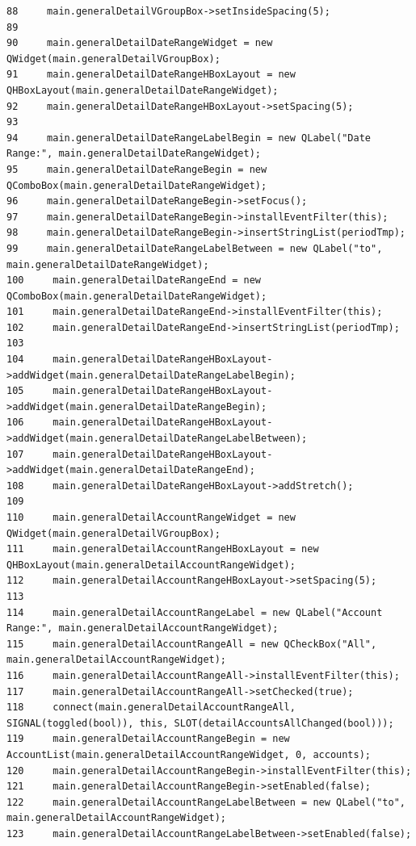 \begin{verbatim}
88     main.generalDetailVGroupBox->setInsideSpacing(5);
89     
90     main.generalDetailDateRangeWidget = new QWidget(main.generalDetailVGroupBox);
91     main.generalDetailDateRangeHBoxLayout = new QHBoxLayout(main.generalDetailDateRangeWidget);
92     main.generalDetailDateRangeHBoxLayout->setSpacing(5);
93     
94     main.generalDetailDateRangeLabelBegin = new QLabel("Date Range:", main.generalDetailDateRangeWidget);
95     main.generalDetailDateRangeBegin = new QComboBox(main.generalDetailDateRangeWidget);
96     main.generalDetailDateRangeBegin->setFocus();
97     main.generalDetailDateRangeBegin->installEventFilter(this);
98     main.generalDetailDateRangeBegin->insertStringList(periodTmp);
99     main.generalDetailDateRangeLabelBetween = new QLabel("to", main.generalDetailDateRangeWidget);
100     main.generalDetailDateRangeEnd = new QComboBox(main.generalDetailDateRangeWidget);
101     main.generalDetailDateRangeEnd->installEventFilter(this);
102     main.generalDetailDateRangeEnd->insertStringList(periodTmp);
103     
104     main.generalDetailDateRangeHBoxLayout->addWidget(main.generalDetailDateRangeLabelBegin);
105     main.generalDetailDateRangeHBoxLayout->addWidget(main.generalDetailDateRangeBegin);
106     main.generalDetailDateRangeHBoxLayout->addWidget(main.generalDetailDateRangeLabelBetween);
107     main.generalDetailDateRangeHBoxLayout->addWidget(main.generalDetailDateRangeEnd);
108     main.generalDetailDateRangeHBoxLayout->addStretch();
109     
110     main.generalDetailAccountRangeWidget = new QWidget(main.generalDetailVGroupBox);
111     main.generalDetailAccountRangeHBoxLayout = new QHBoxLayout(main.generalDetailAccountRangeWidget);
112     main.generalDetailAccountRangeHBoxLayout->setSpacing(5);
113     
114     main.generalDetailAccountRangeLabel = new QLabel("Account Range:", main.generalDetailAccountRangeWidget);
115     main.generalDetailAccountRangeAll = new QCheckBox("All", main.generalDetailAccountRangeWidget);
116     main.generalDetailAccountRangeAll->installEventFilter(this);
117     main.generalDetailAccountRangeAll->setChecked(true);
118     connect(main.generalDetailAccountRangeAll, SIGNAL(toggled(bool)), this, SLOT(detailAccountsAllChanged(bool)));
119     main.generalDetailAccountRangeBegin = new AccountList(main.generalDetailAccountRangeWidget, 0, accounts);
120     main.generalDetailAccountRangeBegin->installEventFilter(this);
121     main.generalDetailAccountRangeBegin->setEnabled(false);
122     main.generalDetailAccountRangeLabelBetween = new QLabel("to", main.generalDetailAccountRangeWidget);
123     main.generalDetailAccountRangeLabelBetween->setEnabled(false);

\end{verbatim}
